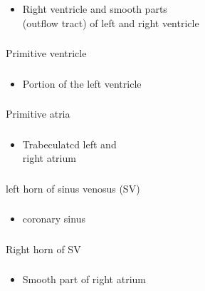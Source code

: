 \documentclass[11pt]{beamer}
\begin{document}
\begin{frame}
 \frametitle{}
\begin{itemize}
\item{Right ventricle and smooth parts \\ (outflow tract) of left and right ventricle}
\end{itemize}
\end{frame}

\begin{frame}
 \frametitle{}
Primitive ventricle
\end{frame}

\begin{frame}
 \frametitle{}
\begin{itemize}
\item{Portion of the left ventricle}
\end{itemize}
\end{frame}

\begin{frame}
 \frametitle{}
Primitive atria
\end{frame}

\begin{frame}
 \frametitle{}
\begin{itemize}
\item{Trabeculatcd left and \\ right atrium}
\end{itemize}
\end{frame}

\begin{frame}
 \frametitle{}
left horn of sinus venosus (SV)
\end{frame}

\begin{frame}
 \frametitle{}
\begin{itemize}
\item{coronary sinus}
\end{itemize}
\end{frame}

\begin{frame}
 \frametitle{}
Right horn of SV
\end{frame}

\begin{frame}
 \frametitle{}
\begin{itemize}
\item{Smooth part of right atrium}
\end{itemize}
\end{frame}
\end{document}

